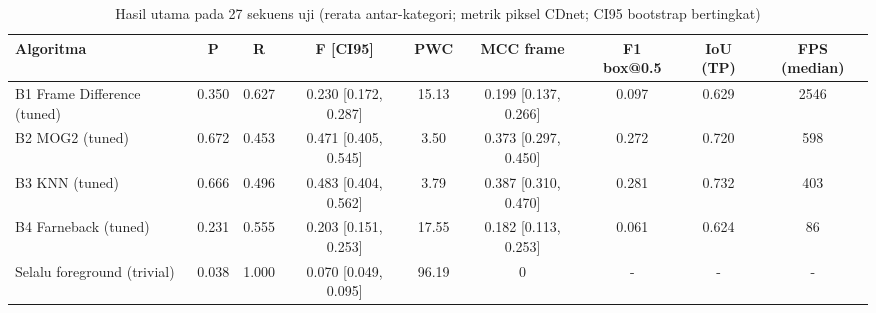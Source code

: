 \begin{table}[t]
\centering
\caption{Hasil utama pada 27 sekuens uji (rerata antar-kategori; metrik piksel CDnet; CI95 bootstrap bertingkat)}
\label{tab:table_main}
\begin{tabular}{lcccccccc}
\toprule
Algoritma & P & R & F [CI95] & PWC & MCC frame & F1 box@0.5 & IoU (TP) & FPS (median) \\
\midrule
B1 Frame Difference (tuned) & 0.350 & 0.627 & 0.230 [0.172, 0.287] & 15.13 & 0.199 [0.137, 0.266] & 0.097 & 0.629 & 2546 \\
B2 MOG2 (tuned) & 0.672 & 0.453 & 0.471 [0.405, 0.545] & 3.50 & 0.373 [0.297, 0.450] & 0.272 & 0.720 & 598 \\
B3 KNN (tuned) & 0.666 & 0.496 & 0.483 [0.404, 0.562] & 3.79 & 0.387 [0.310, 0.470] & 0.281 & 0.732 & 403 \\
B4 Farneback (tuned) & 0.231 & 0.555 & 0.203 [0.151, 0.253] & 17.55 & 0.182 [0.113, 0.253] & 0.061 & 0.624 & 86 \\
Selalu foreground (trivial) & 0.038 & 1.000 & 0.070 [0.049, 0.095] & 96.19 & 0 & - & - & - \\
\bottomrule
\end{tabular}
\end{table}
